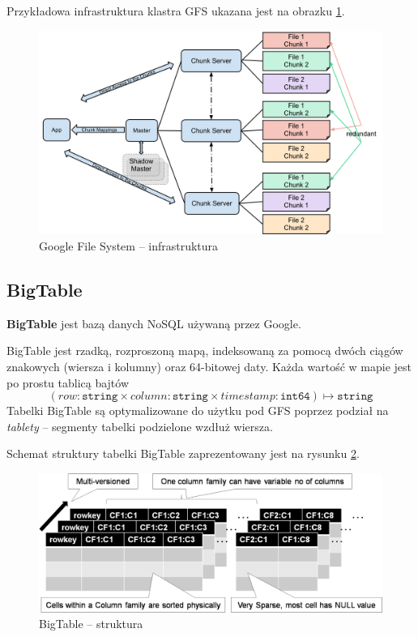 \documentclass[twocolumn]{svjour3}          %
\begin{document}
Przykładowa infrastruktura klastra GFS ukazana jest na obrazku \ref{fig:google:gfs}.


\begin{figure}
    \includegraphics[scale=0.1]{obrazki/GoogleFileSystemGFS.png}
    \caption{Google File System -- infrastruktura}
    \label{fig:google:gfs}       %
\end{figure}

\subsection{BigTable}
\label{ssub:bigtable}
\textbf{BigTable} jest bazą danych NoSQL używaną przez Google. 

BigTable jest rzadką, rozproszoną mapą, indeksowaną za pomocą dwóch ciągów znakowych (wiersza i kolumny) oraz 64-bitowej daty. Każda wartość w mapie jest po prostu tablicą bajtów
$$(row: \texttt{string} \times column: \texttt{string} \times timestamp: \texttt{int64}) \mapsto \texttt{string}$$
Tabelki BigTable są optymalizowane do użytku pod GFS poprzez podział na \textit{tablety} -- segmenty tabelki podzielone wzdłuż wiersza.

Schemat struktury tabelki BigTable zaprezentowany jest na rysunku \ref{fig:google:big-table}.


\begin{figure}
    \centerline{\includegraphics[scale=0.75]{obrazki/big-table.png}}
    \caption{BigTable -- struktura}
    \label{fig:google:big-table}       %
\end{figure}
\end{document}
